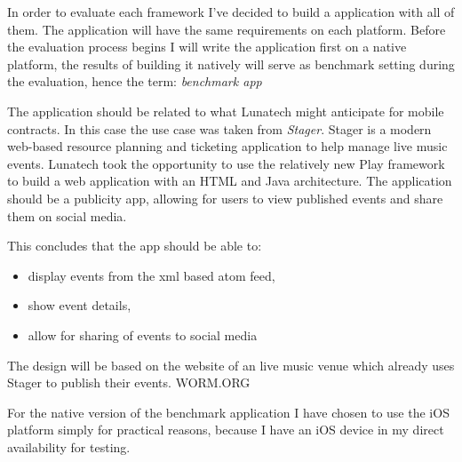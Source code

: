 
In order to evaluate each framework I've decided to build a application with all of them. The application will have the same requirements on each platform. Before the evaluation process begins I will write the application first on a native platform, the results of building it natively will serve as benchmark setting during the evaluation, hence the term: \emph{benchmark app}

The application should be related to what Lunatech might anticipate for mobile contracts. In this case the use case was taken from \emph{Stager}. Stager is a modern web-based resource planning and ticketing application to help manage live music events. Lunatech took the opportunity to use the relatively new Play framework to build a web application with an HTML and Java architecture. The application should be a publicity app, allowing for users to view published events and share them on social media.

This concludes that the app should be able to:
\begin{itemize}
	\item display events from the xml based atom feed,
	\item show event details,
	\item allow for sharing of events to social media
\end{itemize}
The design will be based on the website of an live music venue which already uses Stager to publish their events. WORM.ORG

For the native version of the benchmark application I have chosen to use the iOS platform simply for practical reasons, because I have an iOS device in my direct availability for testing.

